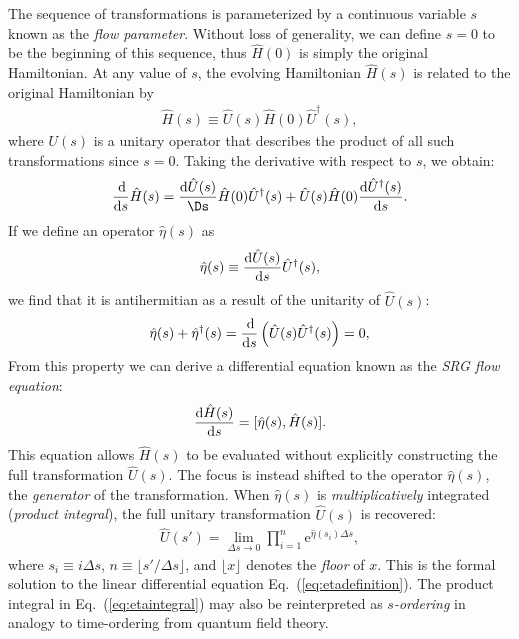 The sequence of transformations is parameterized by a continuous
variable $s$ known as the \textit{flow parameter}.  Without loss of
generality, we can define $s = 0$ to be the beginning of this
sequence, thus $\hat{H}(0)$ is simply the original Hamiltonian.  At
any value of $s$, the evolving Hamiltonian $\hat{H}(s)$ is related to
the original Hamiltonian by
\begin{align*}
  \hat{H}(s) \equiv \hat{U}(s) \hat{H}(0) \hat{U}^\dagger(s),
\end{align*}
where $U(s)$ is a unitary operator that describes the product of all such
transformations since $s = 0$.  Taking the derivative with respect to $s$, we obtain:
\begin{align*}
  \frac{\D}{\D s} \hat{H}(s) = \frac{\D \hat{U}(s)}{\Ds} \hat{H}(0) \hat{U}^\dagger(s)
  + \hat{U}(s) \hat{H}(0) \frac{\D \hat{U}^\dagger (s)}{\D s}.
\end{align*}
If we define an operator $\hat{\eta}(s)$ as
\begin{align} \label{eq:etadefinition}
  \hat{\eta}(s) \equiv \frac{\operatorname{d\!} \hat{U}(s)}{\operatorname{d\!} s} \hat{U}^\dagger(s),
\end{align}
we find that it is antihermitian as a result of the unitarity of $\hat{U}(s)$:
\begin{align*}
  \hat{\eta}(s) + \hat{\eta}^\dagger(s)
  = \frac{\operatorname{d\!}}{\operatorname{d\!} s} \left(\hat{U}(s) \hat{U}^\dagger(s)\right)
  = 0,
\end{align*}
From this property we can derive a differential equation known as the \textit{SRG flow equation}:
\begin{align} \label{eq:imsrgode}
  \frac{\operatorname{d\!} \hat{H}(s)}{\operatorname{d\!} s} = [\hat{\eta}(s), \hat{H}(s)].
\end{align}
This equation allows $\hat{H}(s)$ to be evaluated without explicitly
constructing the full transformation $\hat U(s)$.  The focus is
instead shifted to the operator $\hat \eta(s)$, the \textit{generator}
of the transformation.  When $\hat \eta(s)$ is \emph{multiplicatively}
integrated (\textit{product integral}), the full unitary
transformation $\hat U(s)$ is recovered:
\begin{align} \label{eq:etaintegral}
  \hat U(s')
  = \lim_{\Delta s \to 0} \prod_{i = 1}^n \mathrm{e}^{\hat{\eta}(s_i) \Delta s},
\end{align}
where $s_i \equiv i \Delta s$, $n \equiv \lfloor s' / \Delta
s \rfloor$, and $\lfloor x \rfloor$ denotes the \textit{floor} of $x$.
This is the formal solution to the linear differential
equation Eq.~(\ref{eq:etadefinition}).  The product integral
in Eq.~(\ref{eq:etaintegral}) may also be reinterpreted
as \textit{$s$-ordering} \cite{reimann2013quantum} in analogy
to time-ordering from quantum field theory.


